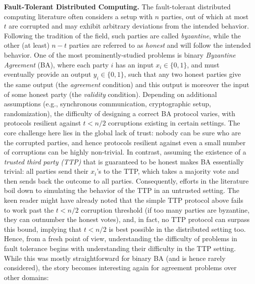 \documentclass[sigconf,nonacm]{aamas}
\begin{document}
\noindent \textbf{Fault-Tolerant Distributed Computing.} The fault-tolerant distributed computing literature often considers a setup with $n$ parties, out of which at most $t$ are corrupted and may exhibit arbitrary deviations from the intended behavior. Following the tradition of the field, such parties are called \emph{byzantine}, while the other (at least) $n - t$ parties are referred to as \emph{honest} and will follow the intended behavior. One of the most prominently-studied problems is binary \emph{Byzantine Agreement} (BA), where each party $i$ has an input $x_i \in \{0, 1\}$, and must eventually provide an output $y_i \in \{0, 1\}$, such that any two honest parties give the same output (the \emph{agreement} condition) and this output is moreover the input of some honest party (the \emph{validity} condition). 
Depending on additional assumptions (e.g., synchronous communication, cryptographic setup, randomization), the difficulty of designing a correct BA protocol varies, with protocols resilient against $t < n/2$ corruptions existing in certain settings.
The core challenge here lies in the global lack of trust: nobody can be sure who are the corrupted parties, and hence protocols resilient against even a small number of corruptions can be highly non-trivial.
In contrast, assuming the existence of a \emph{trusted third party (TTP)} that is guaranteed to be honest makes BA essentially trivial: all parties send their $x_i$'s to the TTP, which takes a majority vote and then sends back the outcome to all parties. Consequently, efforts in the literature boil down to simulating the behavior of the TTP in an untrusted setting. The keen reader might have already noted that the simple TTP protocol above fails to work past the $t < n/2$ corruption threshold (if too many parties are byzantine, they can outnumber the honest votes), and, in fact, no TTP protocol can surpass this bound, implying that $t < n/2$ is best possible in the distributed setting too.
Hence, from a fresh point of view, understanding the difficulty of problems in fault tolerance begins with understanding their difficulty in the TTP setting. While this was mostly straightforward for binary BA (and is hence rarely considered), the story becomes interesting again for agreement problems over other domains:
\end{document}
